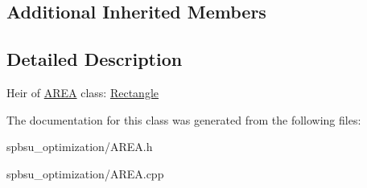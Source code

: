 \subsection*{Additional Inherited Members}


\subsection{Detailed Description}
Heir of \hyperlink{class_a_r_e_a}{A\+R\+EA} class\+: \hyperlink{class_rectangle}{Rectangle} 

The documentation for this class was generated from the following files\+:\begin{DoxyCompactItemize}
\item 
spbsu\+\_\+optimization/A\+R\+E\+A.\+h\item 
spbsu\+\_\+optimization/A\+R\+E\+A.\+cpp\end{DoxyCompactItemize}
